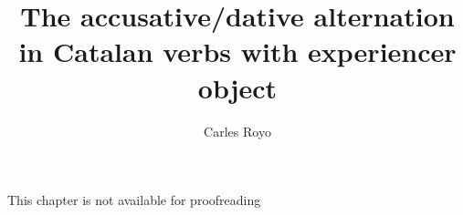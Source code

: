 \documentclass[output=paper,colorlinks,citecolor=brown,modfonts,nonflat]{langsci/langscibook}
\author{Carles Royo\affiliation{Universitat Rovira i Virgili}}
\title{The accusative/dative alternation in Catalan verbs with experiencer object}
\begin{document}
\maketitle

This chapter is not available for proofreading
\end{document}
